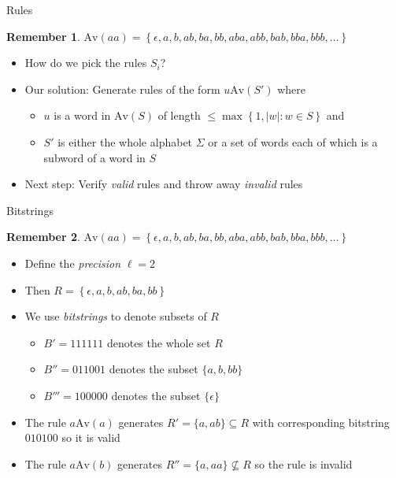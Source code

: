 \documentclass[icelandic]{beamer}
\newtheorem*{remember}{Remember}
\newtheorem*{research questions}{Research questions}
\newcommand{\Av}[1]{{\mathrm{Av}\!\left(#1\right)}}
\begin{document}
\begin{frame}{Rules}
  \begin{remember}
    $\Av{aa} = \left\{ \epsilon, a, b, ab, ba, bb, aba, abb, bab, bba, bbb, \ldots \right\}$
  \end{remember}
  \begin{itemize}[<+->]
    \item How do we pick the rules $S_i$?
    \item Our solution: Generate rules of the form $u \Av{S'}$ where
      \begin{itemize}
        \item $u$ is a word in $\Av{S}$ of length $\leq \max \left \{ 1, |w| \colon w \in S \right\}$ and
        \item $S'$ is either the whole alphabet $\Sigma$ or a set of words each of which is a subword of a word in $S$
      \end{itemize}
    \item Next step: Verify \emph{valid} rules and throw away \emph{invalid} rules
  \end{itemize}
\end{frame}

\begin{frame}{Bitstrings}
  \begin{remember}
    $\Av{aa} = \left\{ \epsilon, a, b, ab, ba, bb, aba, abb, bab, bba, bbb, \ldots \right\}$
  \end{remember}
  \begin{itemize}[<+->]
    \item Define the \emph{precision} $\ell = 2$
    \item Then $R = \left \{ \epsilon, a, b, ab, ba, bb \right \}$
    \item We use \emph{bitstrings} to denote subsets of $R$
      \begin{itemize}
        \item $B' = 111111$ denotes the whole set $R$
        \item $B'' = 011001$ denotes the subset $\{a, b, bb\}$
        \item $B''' = 100000$ denotes the subset $\{\epsilon\}$
      \end{itemize}
    \item The rule $a \Av{a}$ generates $R' = \{ a, ab \} \subseteq R$ with corresponding bitstring $010100$ so it is valid
    \item The rule $a \Av{b}$ generates $R'' = \{ a, aa \} \not \subseteq R$ so the rule is invalid
  \end{itemize}
\end{frame}
\end{document}
